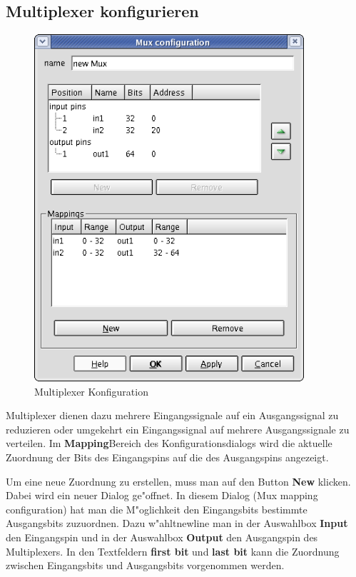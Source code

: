 \documentclass[a4paper,titlepage,12pt,ngerman]{scrbook}
\begin{document}
\subsection{Multiplexer konfigurieren}
\begin{figure}[htbp]

\begin{center}

\includegraphics[width=10cm]{MuxConfiguration}

\caption{Multiplexer Konfiguration}\label{test}

\end{center}

\end{figure}

Multiplexer dienen dazu mehrere Eingangssignale auf ein Ausgangssignal zu reduzieren oder umgekehrt ein  Eingangssignal auf mehrere Ausgangssignale zu verteilen.
Im {\bf Mapping}Bereich des Konfigurationsdialogs wird die aktuelle Zuordnung der Bits des Eingangspins auf die des Ausgangspins angezeigt.\par
Um eine neue Zuordnung zu erstellen, muss man auf den Button {\bf New} klicken. Dabei wird ein neuer Dialog ge"offnet. In diesem Dialog (Mux mapping configuration) hat man die M"oglichkeit den Eingangsbits bestimmte Ausgangsbits zuzuordnen. Dazu w"ahltnewline man in der Auswahlbox {\bf Input} den Eingangspin und in der Auswahlbox {\bf Output} den Ausgangspin des Multiplexers. In den Textfeldern {\bf first bit} und {\bf last bit} kann die Zuordnung zwischen Eingangsbits und Ausgangsbits vorgenommen werden.\par
\end{document}
